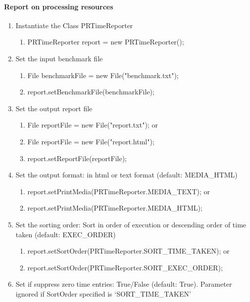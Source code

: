 \paragraph*{Report on processing resources}

\begin{enumerate}
  \item Instantiate the Class PRTimeReporter
  \begin{enumerate}
    \item PRTimeReporter report = new PRTimeReporter();
  \end{enumerate}
  \item Set the input benchmark file
  \begin{enumerate}
    \item File benchmarkFile = new File("benchmark.txt");
    \item report.setBenchmarkFile(benchmarkFile);
  \end{enumerate}
  \item Set the output report file
  \begin{enumerate}
    \item File reportFile = new File("report.txt");
    or
    \item File reportFile = new File("report.html");
    \item report.setReportFile(reportFile); 
  \end{enumerate}
  \item Set the output format:
    in html or text format (default: MEDIA\_HTML)
  \begin{enumerate}
    \item report.setPrintMedia(PRTimeReporter.MEDIA\_TEXT);
    or
    \item report.setPrintMedia(PRTimeReporter.MEDIA\_HTML);
  \end{enumerate}
  \item Set the sorting order: Sort in order 
    of execution or descending order of time taken (default: EXEC\_ORDER)
  \begin{enumerate}
    \item report.setSortOrder(PRTimeReporter.SORT\_TIME\_TAKEN); 
    or
     \item report.setSortOrder(PRTimeReporter.SORT\_EXEC\_ORDER);
  \end{enumerate}
  \item Set if suppress zero time entries:
    True/False (default: True). Parameter ignored if SortOrder specified 
    is `SORT\_TIME\_TAKEN'
  \begin{enumerate}

\end{enumerate}
\end{enumerate}
